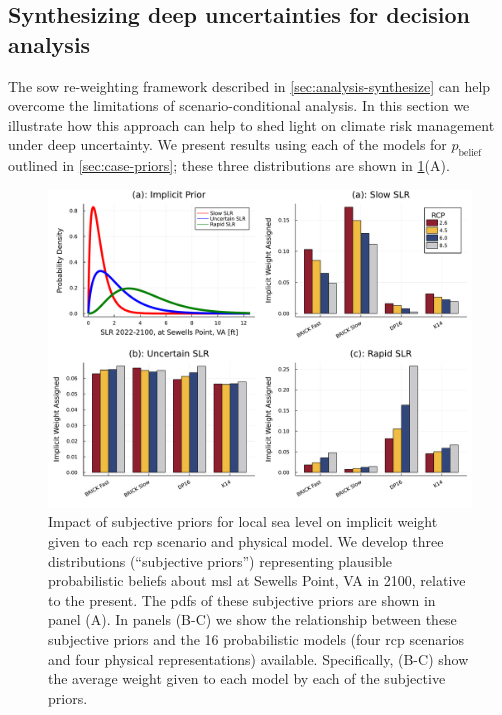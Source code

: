 \documentclass{agujournal2019}
\begin{document}
\subsection{Synthesizing deep uncertainties for decision analysis}\label{sec:results-synthesis}

The \gls{sow} re-weighting framework described in \cref{sec:analysis-synthesize} can help overcome the limitations of scenario-conditional analysis.
In this section we illustrate how this approach can help to shed light on climate risk management under deep uncertainty.
We present results using each of the models for $p_\mathrm{belief}$ outlined in \cref{sec:case-priors}; these three distributions are shown in \cref{fig:lsl-priors-weights}(A).

\begin{figure}
  \centering
  \includegraphics[width=\textwidth]{lsl-priors-weights}
  \caption{
    Impact of subjective priors for local sea level on implicit weight given to each \gls{rcp} scenario and physical model.
    We develop three distributions (``subjective priors'') representing plausible probabilistic beliefs about \gls{msl} at Sewells Point, VA in 2100, relative to the present.
    The \glspl{pdf} of these subjective priors are shown in panel (A).
    In panels (B-C) we show the relationship between these subjective priors and the 16 probabilistic models (four \gls{rcp} scenarios and four physical representations) available.
    Specifically, (B-C) show the average weight given to each model by each of the subjective priors.
  }\label{fig:lsl-priors-weights}
\end{figure}
\end{document}
